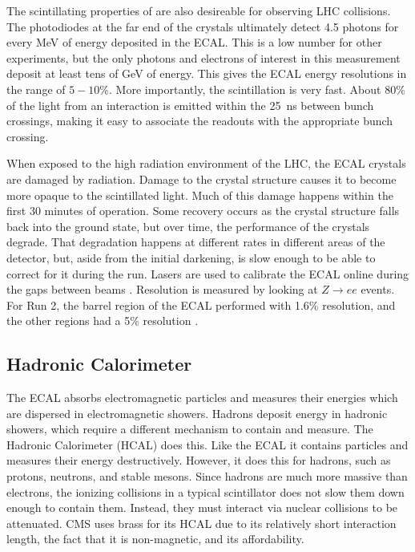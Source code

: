 The scintillating properties of  are also desireable for observing LHC collisions.
The photodiodes at the far end of the crystals
ultimately detect 4.5 photons for every MeV of energy deposited in the ECAL.
This is a low number for other experiments, but the only photons and electrons of
interest in this measurement deposit at least tens of GeV of energy.
This gives the ECAL energy resolutions in the range of $5-10\%$.
More importantly, the scintillation is very fast.
About 80\% of the light from an interaction is emitted within
the \SI{25}{ns} between bunch crossings,
making it easy to associate the readouts with the appropriate bunch crossing.

When exposed to the high radiation environment of the LHC,
the ECAL crystals are damaged by radiation.
Damage to the crystal structure causes it to become more opaque to the scintillated light.
Much of this damage happens within the first 30 minutes of operation.
Some recovery occurs as the crystal structure falls back into the ground state,
but over time, the performance of the crystals degrade.
That degradation happens at different rates in different areas of the detector,
but, aside from the initial darkening,
is slow enough to be able to correct for it during the run.
Lasers are used to calibrate the ECAL online during
the gaps between beams \cite{Monti:2653861}.
Resolution is measured by looking at $Z\rightarrow ee$ events.
For Run 2, the barrel region of the ECAL performed with 1.6\% resolution,
and the other regions had a 5\% resolution \cite{Bartosik:2712238}.

\subsection{Hadronic Calorimeter}

The ECAL absorbs electromagnetic particles and measures their energies
which are dispersed in electromagnetic showers.
Hadrons deposit energy in hadronic showers,
which require a different mechanism to contain and measure.
The Hadronic Calorimeter (HCAL) does this.
Like the ECAL it contains particles and measures their energy destructively.
However, it does this for hadrons, such as protons, neutrons, and stable mesons.
Since hadrons are much more massive than electrons,
the ionizing collisions in a typical scintillator does not slow them down
enough to contain them.
Instead, they must interact via nuclear collisions to be attenuated.
CMS uses brass for its HCAL due to its relatively short interaction length,
the fact that it is non-magnetic, and its affordability.


